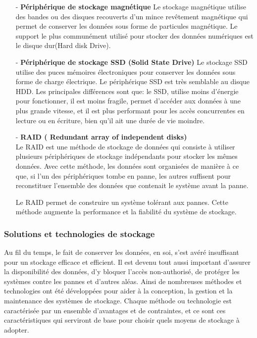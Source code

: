 \begin{itemize}
	\item[-] \textbf{P\'eriph\'erique de stockage magn\'etique}
	Le stockage magn\'etique utilise des bandes ou des disques recouverts d'un mince rev\^etement magn\'etique qui permet de conserver les donn\'ees sous forme de particules magn\'etique\cite{stockagesSecondaireMagnetique}. Le support le plus commun\'ement utilis\'e pour stocker des donn\'ees num\'eriques est  le disque dur(Hard disk Drive)\cite{stockagesSecondaireMagnetique}.\\

	\item[-] \textbf{P\'eriph\'erique de stockage SSD (Solid State Drive)\cite{stockagesSecondaire}}
	Le stockage SSD utilise des puces m\'emoires \'electroniques pour conserver les donn\'ees sous forme de charge \'electrique\cite{stockagesSecondaireElectrique}. Le p\'eriph\'erique SSD est tr\`es semblable au disque HDD. Les principales diff\'erences sont que: le SSD, utilise moins d'\'energie pour fonctionner, il est moins fragile, permet d'acc\'eder aux donn\'ees \`a une plus grande vitesse\cite{stockagesSecondaireElectrique}, et il est plus performant pour les acc\`es concurrentes en lecture ou en \'ecriture, bien qu'il ait une dur\'ee de vie moindre.\\

	\item[-] \textbf{RAID ( Redundant array of independent disks)\cite{MethodesEtTechnologies}\cite{MethodesEtTechnologies1}} \\
	Le RAID est une m\'ethode de stockage de donn\'ees qui consiste \`a utiliser plusieurs p\'eriph\'eriques de stockage ind\'ependants pour stocker les m\^emes donn\'ees. Avec cette m\'ethode, les donn\'ees sont organis\'ees de mani\`ere \`a ce que, si l'un des p\'eriph\'eriques tombe en panne, les autres suffisent pour reconstituer l'ensemble des donn\'ees que contenait le syst\`eme avant la panne. \par
	\noindent Le RAID permet de construire un syst\`eme tol\'erant aux pannes. Cette m\'ethode augmente la performance et la fiabilit\'e du syst\`eme de stockage.\\
\end{itemize}



\subsubsection{Solutions et technologies de stockage}
Au fil du temps, le fait de conserver les donn\'ees, en soi, s'est av\'er\'e insuffisant pour un stockage efficace et efficient. Il est devenu tout aussi important d'assurer la disponibilit\'e des donn\'ees, d'y bloquer l'acc\`es non-authoris\'e, de prot\'eger les syst\`emes contre les pannes et d'autres al\'eas. Ainsi de nombreuses m\'ethodes et technologies ont \'et\'e d\'evelopp\'ees pour aider \`a la conception, la gestion et la maintenance des syst\`emes de stockage. Chaque m\'ethode ou technologie est caract\'eris\'ee par un ensemble d'avantages et de contraintes, et ce sont ces caract\'eristiques qui serviront de base pour choisir quels moyens de stockage \`a adopter.\\

